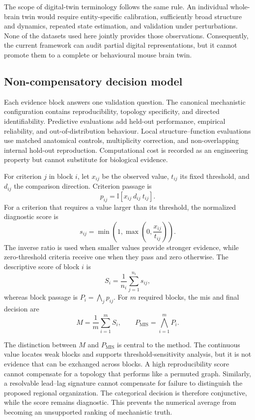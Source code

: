 The scope of digital-twin terminology follows the same rule. An individual
whole-brain twin would require entity-specific calibration, sufficiently broad
structure and dynamics, repeated state estimation, and validation under
perturbations. None of the datasets used here jointly provides those
observations. Consequently, the current framework can audit partial digital
representations, but it cannot promote them to a complete or behavioural mouse
brain twin.

\subsection{Non-compensatory decision model}
\label{subsec:decision-model}

Each evidence block answers one validation question. The canonical mechanistic
configuration contains reproducibility, topology specificity, and directed
identifiability. Predictive evaluations add held-out performance, empirical
reliability, and out-of-distribution behaviour. Local structure--function
evaluations use matched anatomical controls, multiplicity correction, and
non-overlapping internal hold-out reproduction. Computational cost is recorded as an engineering
property but cannot substitute for biological evidence.

For criterion $j$ in block $i$, let $x_{ij}$ be the observed value, $t_{ij}$
its fixed threshold, and $d_{ij}$ the comparison direction. Criterion passage
is
\[
p_{ij}=\mathbb{I}\!\left[x_{ij}\ d_{ij}\ t_{ij}\right].
\]
For a criterion that requires a value larger than its threshold, the normalized
diagnostic score is
\[
s_{ij}=\min\!\left(1,\max\!\left(0,\frac{x_{ij}}{t_{ij}}\right)\right).
\]
The inverse ratio is used when smaller values provide stronger evidence, while
zero-threshold criteria receive one when they pass and zero otherwise. The
descriptive score of block $i$ is
\[
S_i=\frac{1}{n_i}\sum_{j=1}^{n_i}s_{ij},
\]
whereas block passage is $P_i=\bigwedge_j p_{ij}$. For $m$ required blocks,
the \ac{mis} and final decision are
\[
M=\frac{1}{m}\sum_{i=1}^{m}S_i,
\qquad
P_{\mathrm{MIS}}=\bigwedge_{i=1}^{m}P_i.
\]

The distinction between $M$ and $P_{\mathrm{MIS}}$ is central to the method.
The continuous value locates weak blocks and supports threshold-sensitivity
analysis, but it is not evidence that can be exchanged across blocks. A high
reproducibility score cannot compensate for a topology that performs like a
permuted graph. Similarly, a resolvable lead--lag signature cannot compensate
for failure to distinguish the proposed regional organization. The categorical
decision is therefore conjunctive, while the score remains diagnostic. This
prevents the numerical average from becoming an unsupported ranking of
mechanistic truth.

